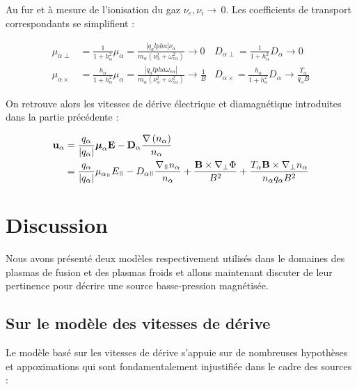 \begin{refsection}
Au fur et à mesure de l'ionisation du gaz $\nu_e, \nu_i\rightarrow\,$0. Les
coefficients de transport correspondants se simplifient :

\begin{align}
\mu_{\alpha\perp}&=\frac{1}{1+h_\alpha^2}\mu_\alpha=\frac{|q_alpha|\nu_\alpha}{m_\alpha(\nu_\alpha^2+\omega_{c\alpha}^2)}\rightarrow
0 &D_{\alpha\perp}=\frac{1}{1+h_\alpha^2}D_\alpha\rightarrow 0
\\
\mu_{\alpha\times}&=\frac{h_\alpha}{1+h_\alpha^2}\mu_\alpha=\frac{|q_alpha\omega_{c\alpha}|}{m_\alpha(\nu_\alpha^2+\omega_{c\alpha}^2)}\rightarrow\frac{1}{B}
&D_{\alpha\times}=\frac{h_\alpha}{1+h_\alpha^2}D_\alpha\rightarrow\frac{T_\alpha}{q_\alpha
B}
\end{align}

On retrouve alors les vitesses de dérive électrique et diamagnétique
introduites dans la partie précédente :

\begin{equation}
\begin{split}
\mathbf u_\alpha&=\frac{q_\alpha}{|q_\alpha|}\boldsymbol{\mu}_\alpha
\mathbf E-\mathbf D_\alpha\frac{\nabla\left( n_\alpha\right)}{n_\alpha}
\\
&= \frac{q_\alpha}{|q_\alpha|}\mu_{\alpha_\para} E_\para -
D_{\alpha\para}\frac{\nabla_\para n_\alpha}{n_\alpha} + \frac{\mathbf
B\times\nabla_\perp \Phi}{B^2}+\frac{T_\alpha\mathbf B\times\nabla_\perp
n_\alpha}{n_\alpha q_\alpha B^2}
\end{split}
\end{equation}

\section{Discussion}
Nous avons présenté deux modèles respectivement utilisés dans le domaines des
plasmas de fusion et des plasmas froids et allons maintenant discuter de leur
pertinence pour décrire une source basse-pression magnétisée.

\subsection{Sur le modèle des vitesses de dérive}
Le modèle basé sur les vitesses de dérive s'appuie sur de nombreuses
hypothèses et appoximations qui sont fondamentalement injustifiée dans le cadre
des sources :


\end{refsection}
